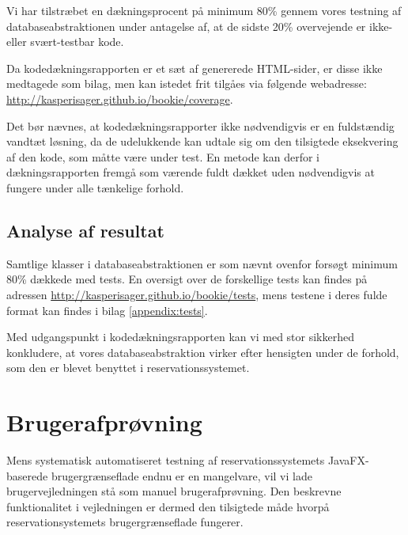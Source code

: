 Vi har tilstræbet en dækningsprocent på minimum 80\% gennem vores testning af databaseabstraktionen under antagelse af, at de sidste 20\% overvejende er ikke- eller svært-testbar kode.

Da kodedækningsrapporten er et sæt af genererede HTML-sider, er disse ikke medtagede som bilag, men kan istedet frit tilgåes via følgende webadresse: \url{http://kasperisager.github.io/bookie/coverage}.

Det bør nævnes, at kodedækningsrapporter ikke nødvendigvis er en fuldstændig vandtæt løsning, da de udelukkende kan udtale sig om den tilsigtede eksekvering af den kode, som måtte være under test. En metode kan derfor i dækningsrapporten fremgå som værende fuldt dækket uden nødvendigvis at fungere under alle tænkelige forhold.

\subsection{Analyse af resultat}

Samtlige klasser i databaseabstraktionen er som nævnt ovenfor forsøgt minimum 80\% dækkede med tests. En oversigt over de forskellige tests kan findes på adressen \url{http://kasperisager.github.io/bookie/tests}, mens testene i deres fulde format kan findes i bilag \ref{appendix:tests}.

Med udgangspunkt i kodedækningsrapporten kan vi med stor sikkerhed konkludere, at vores databaseabstraktion virker efter hensigten under de forhold, som den er blevet benyttet i reservationssystemet.

\section{Brugerafprøvning}

Mens systematisk automatiseret testning af reservationssystemets JavaFX-baserede brugergrænseflade endnu er en mangelvare, vil vi lade brugervejledningen stå som manuel brugerafprøvning. Den beskrevne funktionalitet i vejledningen er dermed den tilsigtede måde hvorpå reservationsystemets brugergrænseflade fungerer.